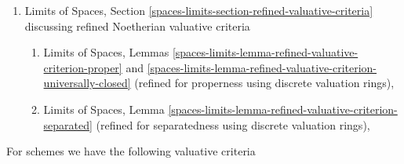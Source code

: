\documentclass{stacks-project}
\theoremstyle{plain}
\theoremstyle{definition}
\theoremstyle{remark}
\numberwithin{equation}{subsection}
\begin{document}
\begin{enumerate}
\begin{enumerate}
\ref{spaces-limits-lemma-check-universally-closed-Noetherian}
(for universal closedness using discrete valuation rings).
\end{enumerate}
\item Limits of Spaces, Section
\ref{spaces-limits-section-refined-valuative-criteria}
discussing refined Noetherian valuative criteria
\begin{enumerate}
\item Limits of Spaces, Lemmas
\ref{spaces-limits-lemma-refined-valuative-criterion-proper} and
\ref{spaces-limits-lemma-refined-valuative-criterion-universally-closed}
(refined for properness using discrete valuation rings),
\item Limits of Spaces, Lemma
\ref{spaces-limits-lemma-refined-valuative-criterion-separated}
(refined for separatedness using discrete valuation rings),
\end{enumerate}
\end{enumerate}
For schemes we have the following valuative criteria
\end{document}
